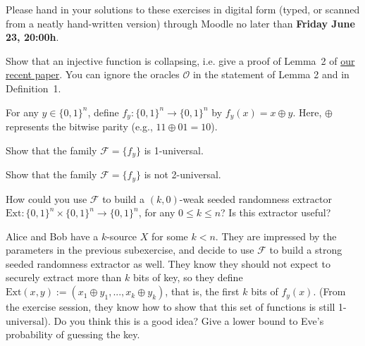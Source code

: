 \documentclass[a4paper,10pt,landscape,twocolumn]{scrartcl}
\newcommand\deadline{Friday June 23, 20:00h}
\begin{document}
\newcommand{\Hmin}{\mathrm{H}_{\mathrm{min}}}

\homeworkproblems

{\sffamily\noindent
Please hand in your solutions to these exercises in digital form (typed, or scanned from a neatly hand-written version) through Moodle no later than \textbf{\deadline}.  %
}
\begin{exercise}
Show that an injective function is collapsing, i.e. give a proof of Lemma~2 of \href{http://homepages.cwi.nl/~schaffne/spool/sponges.pdf}{our recent paper}. You can ignore the oracles $\mathcal{O}$ in the statement of Lemma 2 and in Definition~1.
\end{exercise}


\begin{exercise}
	For any $y \in \{0,1\}^n$, define $f_y : \{0,1\}^n \to \{0,1\}^n$ by $f_y(x) = x \oplus y$. Here, $\oplus$ represents the bitwise parity (e.g., $11 \oplus 01 = 10$).
	\begin{subex}
		Show that the family $\mathscr{F} = \{f_y\}$ is 1-universal.
	\end{subex}
    \begin{subex}
        Show that the family $\mathscr{F} = \{f_y\}$ is not 2-universal.
    \end{subex}
    \begin{subex}
    	How could you use $\mathscr{F}$ to build a $(k,0)$-weak seeded randomness extractor $\text{Ext} : \{0,1\}^n \times \{0,1\}^n \to \{0,1\}^n$, for any $0 \leq k \leq n$? Is this extractor useful?
    \end{subex}
    \begin{subex}
    	Alice and Bob have a $k$-source $X$ for some $k < n$. They are impressed by the parameters in the previous subexercise, and decide to use $\mathscr{F}$ to build a strong seeded randomness extractor as well. They know they should not expect to securely extract more than $k$ bits of key, so they define $\text{Ext}(x,y) := (x_1 \oplus y_1, ..., x_k \oplus y_k)$, that is, the first $k$ bits of $f_y(x)$. (From the exercise session, they know how to show that this set of functions is still 1-universal). Do you think this is a good idea? Give a lower bound to Eve's probability of guessing the key.
    \end{subex}
\end{exercise}
\end{document}
